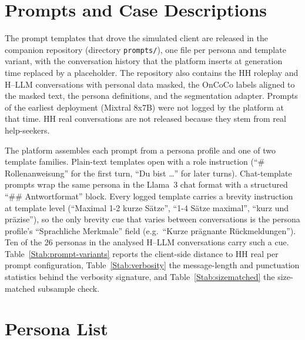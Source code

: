 \documentclass[fleqn,10pt]{JLA_article}
\affiliation{}
\begin{document}
\flushbottom
\maketitle
\thispagestyle{fancy}

\section{Prompts and Case Descriptions}
\label{Ssec:prompts}
The prompt templates that drove the simulated client are released in the companion repository (directory \texttt{prompts/}), one file per persona and template variant, with the conversation history that the platform inserts at generation time replaced by a placeholder. The repository also contains the HH roleplay and H--LLM conversations with personal data masked, the OnCoCo labels aligned to the masked text, the persona definitions, and the segmentation adapter. Prompts of the earliest deployment (Mixtral 8x7B) were not logged by the platform at that time. HH real conversations are not released because they stem from real help-seekers.

The platform assembles each prompt from a persona profile and one of two template families. Plain-text templates open with a role instruction (``\# Rollenanweisung'' for the first turn, ``Du bist \ldots'' for later turns).
Chat-template prompts wrap the same persona in the Llama~3 chat format with a structured ``\#\# Antwortformat'' block. Every logged template carries a brevity instruction at template level (``Maximal 1-2 kurze S\"atze'', ``1-4 S\"atze maximal'', ``kurz und pr\"azise''), so the only brevity cue that varies between conversations is the persona profile's ``Sprachliche Merkmale'' field (e.g.\ ``Kurze pr\"agnante R\"uckmeldungen''). Ten of the 26 personas in the analysed H--LLM conversations carry such a cue. Table~\ref{Stab:prompt-variants} reports the client-side distance to HH real per prompt configuration, Table~\ref{Stab:verbosity} the message-length and punctuation statistics behind the verbosity signature, and Table~\ref{Stab:sizematched} the size-matched subsample check.

\section{Persona List}
\label{Sapp:personas}
\begin{table}[t]
\caption{Personas used in chat roleplays (short descriptions truncated to the first sentence).}
\label{Stab:personas}
\centering
\small
\setlength{\tabcolsep}{3pt}

\end{table}
\end{document}
